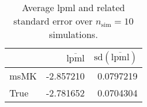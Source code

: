 \begin{table}[H]

\caption{Average lpml and related standard error over $n_{\text{sim}} = 10$ simulations.}
\centering
\begin{tabular}[t]{lrr}
\toprule
  & $\overbar{\text{lpml}}$ & $\text{sd}(\overbar{\text{lpml}})$\\
\midrule
msMK & -2.857210 & 0.0797219\\
True & -2.781652 & 0.0704304\\
\bottomrule
\end{tabular}
\end{table}